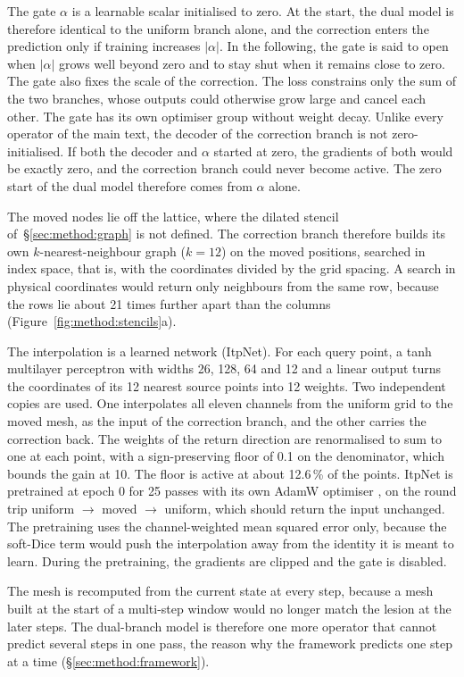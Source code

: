 The gate $\alpha$ is a learnable scalar initialised to zero. At the start, the dual model is
therefore identical to the uniform branch alone, and the correction enters
the prediction only if training increases $|\alpha|$. In the following,
the gate is said to open when $|\alpha|$ grows well beyond zero and to stay
shut when it remains close to zero. The gate also fixes the scale of the
correction. The loss constrains only the sum of the two branches, whose
outputs could otherwise grow large and cancel each other. The gate has its
own optimiser group without weight decay. Unlike every operator of the
main text, the decoder of the correction branch is not zero-initialised.
If both the decoder and $\alpha$ started at zero, the gradients of both
would be exactly zero, and the correction branch could never become
active. The zero start of the dual model therefore comes from $\alpha$
alone.

The moved nodes lie off the lattice, where the dilated stencil
of~\S\ref{sec:method:graph} is not defined. The correction branch therefore
builds its own $k$-nearest-neighbour graph ($k = 12$) on the moved
positions, searched in index space, that is, with the coordinates divided
by the grid spacing. A search in physical coordinates would return only
neighbours from the same row, because the rows lie about 21 times further
apart than the columns (Figure~\ref{fig:method:stencils}a).

The interpolation is a learned network (ItpNet). For each query point, a
tanh multilayer perceptron with widths 26, 128, 64 and 12 and a linear
output turns the coordinates of its 12 nearest source points into 12
weights. Two independent copies are used. One interpolates all eleven
channels from the uniform grid to the moved mesh, as the input of the
correction branch, and the other carries the correction back. The weights
of the return direction are renormalised to sum to one at each point, with
a sign-preserving floor of 0.1 on the denominator, which bounds the gain at
10. The floor is active at about 12.6\,\% of the points. ItpNet is
pretrained at epoch 0 for 25 passes with its own AdamW optimiser
\citep{Loshchilov2019}, on the round trip uniform $\to$ moved $\to$
uniform, which should return the input unchanged. The pretraining uses the
channel-weighted mean squared error only, because the soft-Dice term would
push the interpolation away from the identity it is meant to learn. During
the pretraining, the gradients are clipped and the gate is disabled.

The mesh is recomputed from the current state at every step, because a
mesh built at the start of a multi-step window would no longer match the
lesion at the later steps. The dual-branch model is therefore one more
operator that cannot predict several steps in one pass, the reason why the
framework predicts one step at a time (\S\ref{sec:method:framework}).

